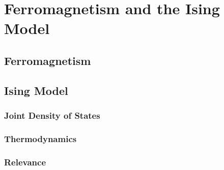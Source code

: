 \chapter{Ferromagnetism and the Ising Model}

\section{Ferromagnetism}


\section{Ising Model}

\subsection{Joint Density of States}

\subsection{Thermodynamics}

\subsection{Relevance}